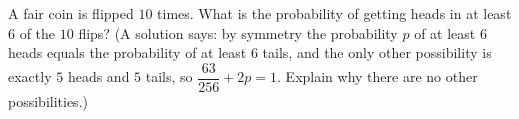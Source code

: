 A fair coin is flipped $10$ times. What is the probability of getting heads in at least $6$ of the $10$ flips? (A solution says: by symmetry the probability $p$ of at least $6$ heads equals the probability of at least $6$ tails, and the only other possibility is exactly $5$ heads and $5$ tails, so $\dfrac{63}{256}+2p=1$. Explain why there are no other possibilities.)
